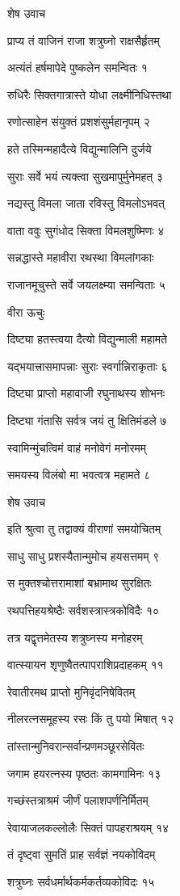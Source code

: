 शेष उवाच

प्राप्य तं वाजिनं राजा शत्रुघ्नो राक्षसैर्हृतम्

अत्यंतं हर्षमापेदे पुष्कलेन समन्वितः १

रुधिरैः सिक्तगात्रास्ते योधा लक्ष्मीनिधिस्तथा

रणोत्साहेन संयुक्तं प्रशशंसुर्महानृपम् २

हते तस्मिन्महादैत्ये विद्युन्मालिनि दुर्जये

सुराः सर्वे भयं त्यक्त्वा सुखमापुर्मुनेमहत् ३

नद्यस्तु विमला जाता रविस्तु विमलोऽभवत्

वाता ववुः सुगंधोद सिक्ता विमलशुष्मिणः ४

सन्नद्धास्ते महावीरा रथस्था विमलांगकाः

राजानमूचुस्ते सर्वे जयलक्ष्म्या समन्विताः ५

वीरा ऊचुः

दिष्ट्या हतस्त्वया दैत्यो विद्युन्माली महामते

यद्भयात्त्रासमापन्नाः सुराः स्वर्गान्निराकृताः ६

दिष्ट्या प्राप्तो महावाजी रघुनाथस्य शोभनः

दिष्ट्या गंतासि सर्वत्र जयं तु क्षितिमंडले ७

स्वामिन्मुंचत्विमं वाहं मनोवेगं मनोरमम्

समयस्य विलंबो मा भवत्वत्र महामते ८

शेष उवाच

इति श्रुत्वा तु तद्वाक्यं वीराणां समयोचितम्

साधु साधु प्रशस्यैतान्मुमोच हयसत्तमम् ९

स मुक्तश्चोत्तरामाशां बभ्रामाथ सुरक्षितः

रथपत्तिहयश्रेष्ठैः सर्वशस्त्रास्त्रकोविदैः १०

तत्र यद्वृत्तमेतस्य शत्रुघ्नस्य मनोहरम्

वात्स्यायन शृणुष्वैतत्पापराशिप्रदाहकम् ११

रेवातीरमथ प्राप्तो मुनिवृंदनिषेवितम्

नीलरत्नसमूहस्य रसः किं तु पयो मिषात् १२

तांस्तान्मुनिवरान्सर्वान्प्रणमञ्छूरसेवितः

जगाम हयरत्नस्य पृष्ठतः कामगामिनः १३

गच्छंस्तत्राश्रमं जीर्णं पलाशपर्णनिर्मितम्

रेवायाजलकल्लोलैः सिक्तं पापहराश्रयम् १४

तं दृष्ट्वा सुमतिं प्राह सर्वज्ञं नयकोविदम्

शत्रुघ्नः सर्वधर्मार्थकर्मकर्तव्यकोविदः १५

